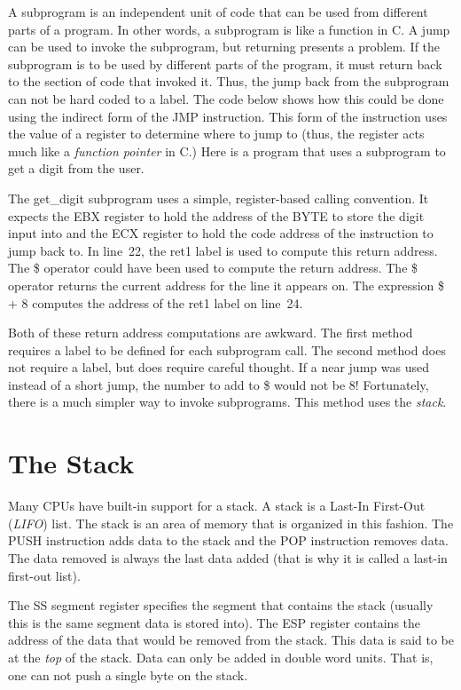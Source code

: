 A subprogram is an independent unit of code that can be used from different
parts of a program. In other words, a subprogram is like a function in C. A
jump can be used to invoke the subprogram, but returning presents a problem.
If the subprogram is to be used by different parts of the program, it must
return back to the section of code that invoked it. Thus, the jump back from
the subprogram can not be hard coded to a label. The code below shows how this
could be done using the indirect form of the {\code JMP} instruction. This 
form of the instruction uses the value of a register to determine where to
jump to (thus, the register acts much like a \emph{function pointer} in C.)
Here is a program that uses a subprogram to get a digit from the user.


The {\code get\_digit} subprogram uses a simple, register-based calling
convention. It expects the EBX register to hold the address of the
BYTE to store the digit input into and the ECX register to hold the
code address of the instruction to jump back to. In line~22,
the {\code ret1} label is used to compute this return address. The {\code \$} 
operator could have been used to compute the return
address. The {\code \$} operator returns the current address for the
line it appears on. The expression {\code \$ + 8} computes the address
of the {\code ret1} label on line~24.

Both of these return address computations are awkward. The first method
requires a label to be defined for each subprogram call. The second method
does not require a label, but does require careful thought. If a near jump
was used instead of a short jump, the number to add to {\code \$} would not
be 8! Fortunately, there is a much simpler way to invoke subprograms. This
method uses the \emph{stack}.

\section{The Stack}

Many CPUs have built-in support for a stack. A stack is a Last-In First-Out
(\emph{LIFO}) list. The stack is an area of memory that is organized in this
fashion. The {\code PUSH} instruction adds data to the stack and the
{\code POP} instruction removes data. The data removed is always the last
data added (that is why it is called a last-in first-out list).

The SS segment register specifies the segment that contains the stack (usually
this is the same segment data is stored into). The ESP register contains the
address of the data that would be removed from the stack. This data is said
to be at the \emph{top} of the stack. Data can only be added in double word
units. That is, one can not push a single byte on the stack.


